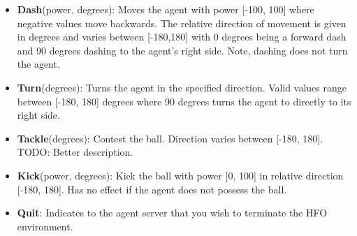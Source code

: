 \documentclass[12pt]{article}
\begin{document}
\begin{itemize}
\item{\textbf{Dash}(power, degrees): Moves the agent with power [-100,
    100] where negative values move backwards. The relative direction
  of movement is given in degrees and varies between [-180,180] with 0
  degrees being a forward dash and 90 degrees dashing to the agent's
  right side. Note, dashing does not turn the agent.}
\item{\textbf{Turn}(degrees): Turns the agent in the
  specified direction. Valid values range between [-180, 180] degrees
  where 90 degrees turns the agent to directly to its right side.}
\item{\textbf{Tackle}(degrees): Contest the ball. Direction
  varies between [-180, 180]. TODO: Better description.}
\item{\textbf{Kick}(power, degrees): Kick the ball with power [0, 100]
  in relative direction [-180, 180]. Has no effect if the agent does
  not possess the ball.}
\item{\textbf{Quit}: Indicates to the agent server that you wish to
  terminate the HFO environment.}
\end{itemize}
\end{document}
